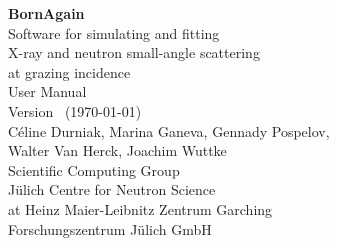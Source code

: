


\thispagestyle{empty}
\strut\vspace{10mm}
\begin{center}
\Huge
{\bf BornAgain}\\[10mm]
\Large
Software for simulating and fitting\\[.2ex]
X-ray and neutron small-angle scattering\\[.2ex]
at grazing incidence\\[15mm]
User Manual\\[5mm]
\large
Version \UserManualVersionNumber\ (\today)\\[30mm]
\Large
Céline Durniak, Marina Ganeva, Gennady Pospelov,\\[1ex]
Walter Van Herck, Joachim Wuttke\\[10mm]
\large
Scientific Computing Group\\[.2ex]
J\"ulich Centre for Neutron Science\\[.2ex]
at Heinz Maier-Leibnitz Zentrum Garching\\[.2ex]
Forschungszentrum J\"ulich GmbH
\end{center}
\newpage




